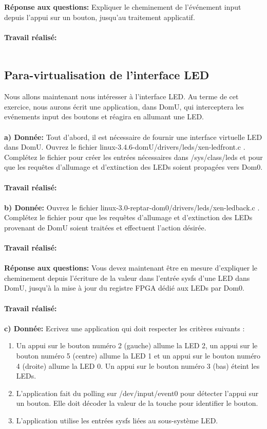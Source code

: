 \textbf{Réponse aux questions: }Expliquer le cheminement de l'événement input depuis l'appui sur un bouton, jusqu'au traitement applicatif.\\\\
\textbf{Travail réalisé: }\\\\
\subsection{Para-virtualisation de l'interface LED}
Nous allons maintenant nous intéresser à l’interface LED. Au terme de cet exercice, nous aurons écrit
une application, dans DomU, qui interceptera les evénements input des boutons et réagira en allumant
une LED.\\\\
\textbf{a) Donnée: }Tout d’abord, il est nécessaire de fournir une interface virtuelle LED dans DomU. Ouvrez le
fichier linux-3.4.6-domU/drivers/leds/xen-ledfront.c . Complétez le fichier pour créer les entrées
nécessaires dans /sys/class/leds et pour que les requêtes d’allumage et d’extinction des LEDs
soient propagées vers Dom0.\\\\
\textbf{Travail réalisé: }\\\\
\textbf{b) Donnée: }Ouvrez le fichier linux-3.0-reptar-dom0/drivers/leds/xen-ledback.c . Complétez le fichier pour que
les requêtes d’allumage et d’extinction des LEDs provenant de DomU soient traitées et effectuent
l’action désirée.\\\\
\textbf{Travail réalisé: }\\\\
\textbf{Réponse aux questions: }Vous devez maintenant être en mesure d'expliquer le cheminement depuis l’écriture de la valeur
dans l’entrée sysfs d’une LED dans DomU, jusqu’à la mise à jour du registre FPGA dédié aux LEDs
par Dom0.\\\\
\textbf{Travail réalisé: }\\\\
\textbf{c) Donnée: }Ecrivez une application qui doit respecter les critères suivants :
\begin{enumerate}
	\item Un appui sur le bouton numéro 2 (gauche) allume la LED 2, un appui sur le bouton numéro 5 (centre)
	allume la LED 1 et un appui sur le bouton numéro 4 (droite) allume la LED 0. Un appui sur le
	bouton numéro 3 (bas) éteint les LEDs.
	\item L’application fait du polling sur /dev/input/event0 pour détecter l’appui sur un bouton. Elle
	doit décoder la valeur de la touche pour identifier le bouton.
	\item L’application utilise les entrées sysfs liées au sous-système LED.
\end{enumerate}
